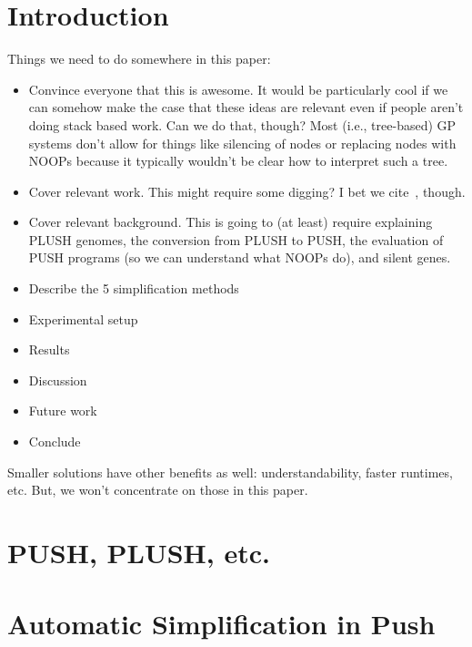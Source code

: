 \section{Introduction}
\label{sec:intro}


Things we need to do somewhere in this paper:
\begin{itemize}
	\item Convince everyone that this is awesome. It would be particularly cool if we can somehow make the case that these ideas are relevant even if people aren't doing stack based work. Can we do that, though? Most (i.e., tree-based)
	GP systems don't allow for things like silencing of nodes or replacing nodes
	with NOOPs because it typically wouldn't be clear how to interpret such a tree.
	\item Cover relevant work. This might require some digging? I bet we cite~\cite{Helmuth:2015:dissertation}, though.
	\item Cover relevant background. This is going to (at least) require explaining PLUSH genomes, the conversion from PLUSH to PUSH, the evaluation of PUSH programs (so we can understand what NOOPs do), and silent genes.
	\item Describe the 5 simplification methods
	\item Experimental setup
	\item Results
	\item Discussion
	\item Future work
	\item Conclude
\end{itemize}

Smaller solutions have other benefits as well: understandability, faster runtimes, etc. But, we won't concentrate on those in this paper.

\section{PUSH, PLUSH, etc.}
\label{sec:push}


\section{Automatic Simplification in Push}
\label{sec:simplification}

